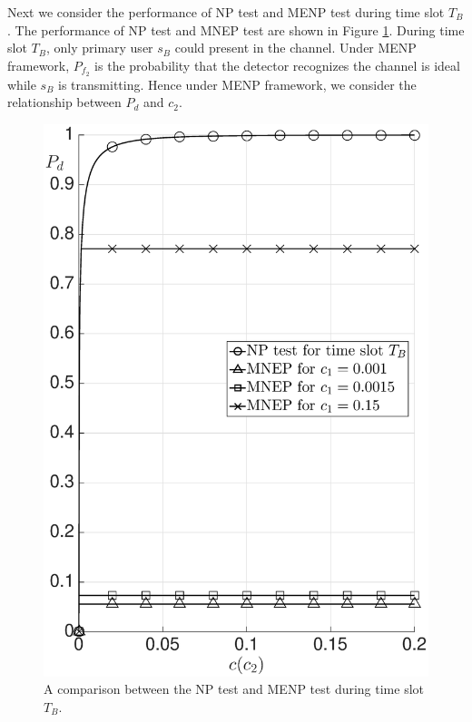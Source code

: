 Next we consider the performance of NP test and MENP test during time slot $T_B$.
The performance of NP test and MNEP test are shown in Figure \ref{pic:20150704a0}. During time slot $T_B$, only primary user $s_B$ could present in the channel. Under MENP framework, $P_{f_2}$ is the probability that the detector recognizes the channel is ideal while $s_B$ is transmitting. Hence under MENP framework, we consider the relationship between $P_d$ and $c_2$.

\begin{figure}[!hbp]
  \centering
  \includegraphics[width = 14cm]{5/SIb.eps}
  \caption{A comparison between the NP test and MENP test during time slot $T_B$.} 
  \label{pic:20150704a0}
\end{figure} 

